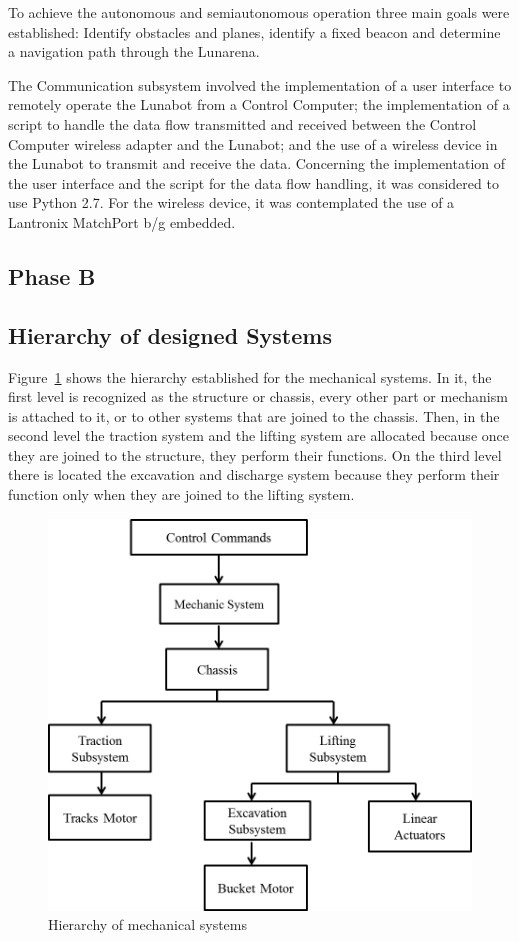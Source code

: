 \documentclass[conference]{IEEEtran}
\begin{document}
To achieve the autonomous and semiautonomous operation three main goals were established: Identify obstacles and planes, identify a fixed beacon and determine a navigation path through the Lunarena.

The Communication subsystem involved the implementation of a user interface to remotely operate the Lunabot from a Control Computer; the implementation of a script to handle the data flow transmitted and received between the Control Computer wireless adapter and the Lunabot; and the use of a wireless device in the Lunabot to transmit and receive the data. Concerning the implementation of the user interface and the script for the data flow handling, it was considered to use Python 2.7. For the wireless device, it was contemplated the use of a Lantronix MatchPort b/g embedded.

\subsection{Phase B}
\subsection{Hierarchy  of designed Systems }

Figure~\ref{fg: fig19} shows the hierarchy established for the mechanical systems. In it, the first level is recognized as the structure or chassis, every other part or mechanism is attached to it, or to other systems that are joined to the chassis. Then, in the second level the traction system and the lifting system are allocated because once they are joined to the structure, they perform their functions. On the third level there  is located the excavation and discharge system because they perform their function only when they are joined to the lifting system.

 \begin{figure}[!htb] 
 \centering
 \includegraphics [width=0.8\linewidth]{img/Figure20}
 \caption{Hierarchy of mechanical systems}
 \label{fg: fig19}
 \end{figure}
\end{document}
